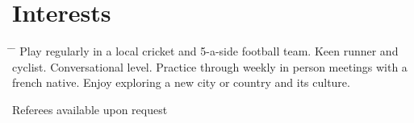 \documentclass[10pt]{article} %
\begin{document}



\vspace{-7mm}
\section{Interests}

\begin{tabbing}
  \hspace{2mm} \= \hspace{18mm} \= \kill 
     {Play regularly in a local cricket and 5-a-side football team. Keen runner and cyclist.}
     {Conversational level. Practice through weekly in person meetings with a french native.}
     {Enjoy exploring a new city or country and its culture.}
\end{tabbing}

Referees available upon request
\end{document}
